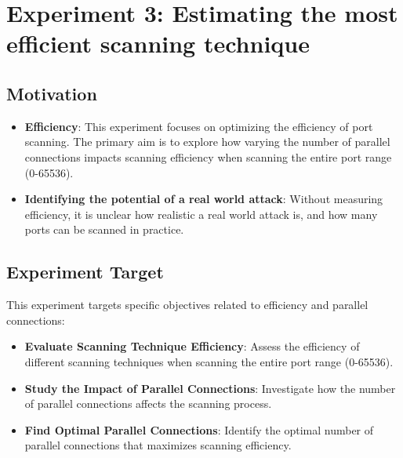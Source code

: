 \section{Experiment 3: Estimating the most efficient scanning technique}

\subsection{Motivation}

\begin{itemize}
    \item \textbf{Efficiency}: This experiment focuses on optimizing the efficiency of port scanning. The primary aim is to explore how varying the number of parallel connections impacts scanning efficiency when scanning the entire port range (0-65536). 
    \item \textbf{Identifying the potential of a real world attack}: Without measuring efficiency, it is unclear how realistic a real world attack is, and how many ports can be scanned in practice.
\end{itemize}

\subsection{Experiment Target}

This experiment targets specific objectives related to efficiency and parallel connections:

\begin{itemize}
    \item \textbf{Evaluate Scanning Technique Efficiency}: Assess the efficiency of different scanning techniques when scanning the entire port range (0-65536).
    \item \textbf{Study the Impact of Parallel Connections}: Investigate how the number of parallel connections affects the scanning process.
    \item \textbf{Find Optimal Parallel Connections}: Identify the optimal number of parallel connections that maximizes scanning efficiency.
\end{itemize}



